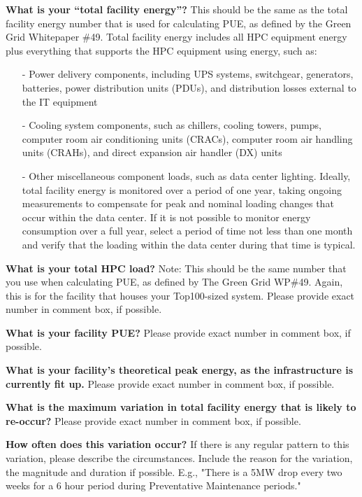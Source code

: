 \noindent
\textbf{What is your ``total facility energy''?}
This should be the same as the total facility energy number that is used for calculating PUE, 
as defined by the Green Grid Whitepaper \#49.  Total facility energy includes all 
HPC equipment energy plus everything that supports the HPC equipment using energy, such as:
\begin{itemize} [nosep]
\item[{-}]
Power delivery components, including UPS systems, switchgear, generators, batteries, power 
distribution units (PDUs), and distribution losses external to the IT equipment  
\item[{-}]
Cooling system components, such as chillers, cooling towers, pumps, computer 
room air conditioning units (CRACs), computer room air handling units (CRAHs), and direct 
expansion air handler (DX) units  
\item[{-}]
Other miscellaneous component loads, such as data center lighting.
Ideally, total facility energy is monitored over a period of one year, taking 
ongoing measurements to compensate for peak and nominal loading changes that occur within the data 
center. If it is not possible to monitor energy consumption over a full year, select a period 
of time not less than one month and verify that the loading within the data center 
during that time is typical.	
\end{itemize}

\wl
\noindent
\textbf{What is your total HPC load?}
Note:  This should be the same number that you use when calculating PUE, as defined by 
The Green Grid WP\#49.  Again, this is for the facility that houses your Top100-sized system.  	
Please provide exact number in comment box, if possible.	

\wl
\noindent
\textbf{What is your facility PUE?}
Please provide exact number in comment box, if possible.

\wl
\noindent
\textbf{What is your facility's theoretical peak energy, as the infrastructure is currently fit up.}
Please provide exact number in comment box, if possible.	

\wl
\noindent
\textbf{What is the maximum variation in total facility energy that is likely to re-occur?}
Please provide exact number in comment box, if possible.

\wl
\noindent
\textbf{How often does this variation occur?}
If there is any regular pattern to this variation, please describe the circumstances.  
Include the reason for the variation, the magnitude and duration if possible.  
E.g., "There is a 5MW drop every two weeks for a 6 hour period during Preventative Maintenance 
periods." 


